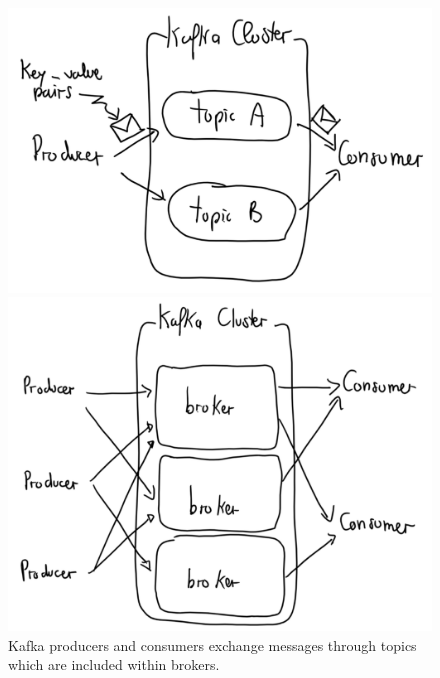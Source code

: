 \documentclass[10pt,a4paper]{article}
\begin{document}
\begin{figure}[h!]
\centering
\begin{minipage}{.5\textwidth}
  \centering
  \includegraphics[width=.9\linewidth]{images/kafka-topics}
\end{minipage}%
\begin{minipage}{.5\textwidth}
  \centering
  \includegraphics[width=.9\linewidth]{images/kafka-brokers}
\end{minipage}
	\caption{Kafka producers and consumers exchange messages through topics which are included within brokers.}
\end{figure} 
\end{document}
